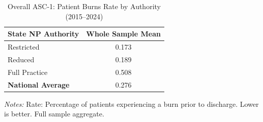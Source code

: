 \begin{table}[htbp]
    \centering
    \caption{Overall ASC-1: Patient Burns Rate by Authority (2015--2024)}
    \label{tab:asc_rate_1_full}
    \vspace{0.2cm}
    \begin{tabular}{lc}
        \toprule
        \textbf{State NP Authority} & \textbf{Whole Sample Mean} \\
        \midrule
        Restricted & 0.173 \\
        Reduced & 0.189 \\
        Full Practice & 0.508 \\
        \midrule
        \textbf{National Average} & 0.276 \\
        \bottomrule
    \end{tabular}
    \vspace{0.1cm}
    \begin{minipage}{0.6\textwidth}
        \footnotesize \textit{Notes:} Rate: Percentage of patients experiencing a burn prior to discharge. Lower is better. Full sample aggregate.
    \end{minipage}
\end{table}